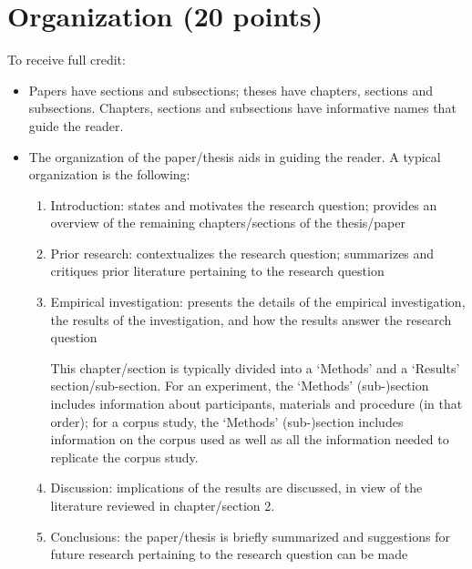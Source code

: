 \documentclass[11pt,fleqn,a4paper/thesis]{article}
\newcommand{\6}{\mbox{$[\hspace*{-.6mm}[$}}
\newcommand{\9}{\mbox{$]\hspace*{-.6mm}]$}}
\begin{document}
\section{Organization (20 points)}

To receive full credit:

\begin{itemize}[itemsep=-1pt,leftmargin=2.5ex,topsep=-2pt]

\item Papers have sections and subsections; theses have chapters, sections and subsections. Chapters, sections and subsections have informative names that guide the reader.

\item The organization of the paper/thesis aids in guiding the reader. A typical organization is the following:

\begin{enumerate}[itemsep=-1pt,leftmargin=3.5ex,topsep=-2pt]

\item Introduction: states and motivates the research question; provides an overview of the remaining chapters/sections of the thesis/paper

\item Prior research: contextualizes the research question; summarizes and critiques prior literature pertaining to the research question

\item Empirical investigation: presents the details of the empirical investigation, the results of the investigation, and how the results answer the research question

This chapter/section is typically divided into a `Methods' and a `Results' section/sub-section. For an experiment, the `Methods' (sub-)section includes information about participants, materials and procedure (in that order); for a corpus study, the `Methods' (sub-)section includes information on the corpus used as well as all the information needed to replicate the corpus study.

\item Discussion: implications of the results are discussed, in view of the literature reviewed in chapter/section 2.

\item Conclusions: the paper/thesis is briefly summarized and suggestions for future research pertaining to the research question can be made

\end{enumerate}




\end{itemize}
\end{document}
